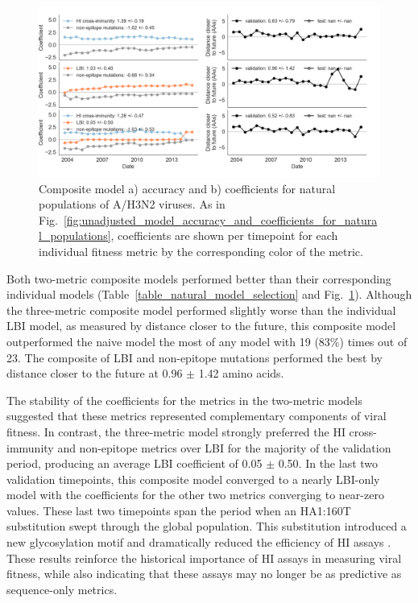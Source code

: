 \begin{figure}[ht]
  \begin{center}
  \includegraphics[width=\textwidth]{figures/best-composite-unadjusted-model-accuracy-and-coefficients-for-natural-populations.png}
  \caption{
    Composite model a) accuracy and b) coefficients for natural populations of A/H3N2 viruses.
    As in Fig.~\ref{fig:unadjusted_model_accuracy_and_coefficients_for_natural_populations}, coefficients are shown per timepoint for each individual fitness metric by the corresponding color of the metric.
  }
  \label{fig:unadjusted_composite_model_accuracy_and_coefficients_for_natural_populations}
  \end{center}
\end{figure}

Both two-metric composite models performed better than their corresponding individual models (Table~\ref{table_natural_model_selection} and Fig.~\ref{fig:unadjusted_composite_model_accuracy_and_coefficients_for_natural_populations}).
Although the three-metric composite model performed slightly worse than the individual LBI model, as measured by distance closer to the future, this composite model outperformed the naive model the most of any model with 19 (83\%) times out of 23.
The composite of LBI and non-epitope mutations performed the best by distance closer to the future at 0.96 $\pm$ 1.42 amino acids.

The stability of the coefficients for the metrics in the two-metric models suggested that these metrics represented complementary components of viral fitness.
In contrast, the three-metric model strongly preferred the HI cross-immunity and non-epitope metrics over LBI for the majority of the validation period, producing an average LBI coefficient of 0.05 $\pm$ 0.50.
In the last two validation timepoints, this composite model converged to a nearly LBI-only model with the coefficients for the other two metrics converging to near-zero values.
These last two timepoints span the period when an HA1:160T substitution swept through the global population.
This substitution introduced a new glycosylation motif and dramatically reduced the efficiency of HI assays \cite{Zost2017}.
These results reinforce the historical importance of HI assays in measuring viral fitness, while also indicating that these assays may no longer be as predictive as sequence-only metrics.

